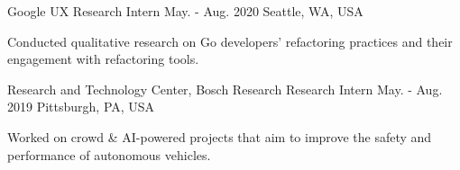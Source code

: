 \begin{cventries}
  \cventry
  {Google} %
  {UX Research Intern } %
  {May. - Aug. 2020} %
  {Seattle, WA, USA} %
  {
    \begin{cvitems} %
      \item {Conducted qualitative research on Go developers' refactoring practices and their engagement with refactoring tools.}
    \end{cvitems}
  }

\cventry
  {Research and Technology Center, Bosch Research} %
  {Research Intern } %
  {May. - Aug. 2019} %
  {Pittsburgh, PA, USA} %
  {
    \begin{cvitems} %
      \item {Worked on crowd \& AI-powered  projects that aim to improve the safety and performance of autonomous vehicles.}
    \end{cvitems}
  }
\end{cventries}








